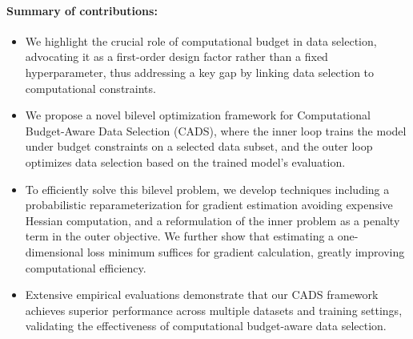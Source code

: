\paragraph{Summary of contributions:}
\begin{itemize}
\item We highlight the crucial role of computational budget in data selection, advocating it as a first-order design factor rather than a fixed hyperparameter, thus addressing a key gap by linking data selection to computational constraints.

\item We propose a novel bilevel optimization framework for Computational Budget-Aware Data Selection (CADS), where the inner loop trains the model under budget constraints on a selected data subset, and the outer loop optimizes data selection based on the trained model’s evaluation.

\item To efficiently solve this bilevel problem, we develop techniques including a probabilistic reparameterization for gradient estimation avoiding expensive Hessian computation, and a reformulation of the inner problem as a penalty term in the outer objective. We further show that estimating a one-dimensional loss minimum suffices for gradient calculation, greatly improving computational efficiency.

\item Extensive empirical evaluations demonstrate that our CADS framework achieves superior performance across multiple datasets and training settings, validating the effectiveness of computational budget-aware data selection.
\end{itemize}



